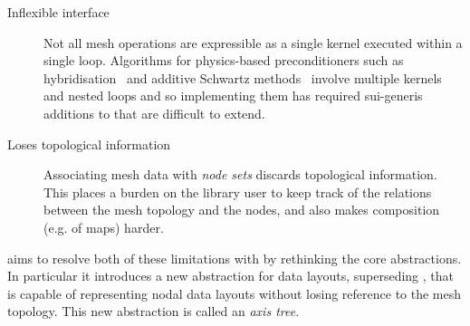\documentclass[thesis]{subfiles}
\begin{document}
\begin{description}
  \item[Inflexible interface]
    Not all mesh operations are expressible as a single kernel executed within a single loop.
    Algorithms for physics-based preconditioners such as hybridisation~\cite{gibsonSlateExtendingFiredrake2020} and additive Schwartz methods~\cite{farrellPCPATCHSoftwareTopological2021} involve multiple kernels and nested loops and so implementing them has required sui-generis additions to  that are difficult to extend.

  \item[Loses topological information]
    Associating mesh data with \textit{node sets} discards topological information.
    This places a burden on the library user to keep track of the relations between the mesh topology and the nodes, and also makes composition (e.g. of maps) harder.
\end{description}

 aims to resolve both of these limitations with  by rethinking the core abstractions.
In particular it introduces a new abstraction for data layouts, superseding , that is capable of representing nodal data layouts without losing reference to the mesh topology.
This new abstraction is called an \emph{axis tree}.
\end{document}
